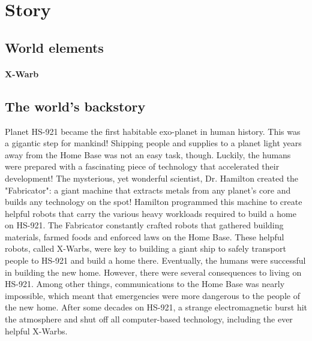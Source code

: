 \documentclass[../Main.tex]{subfiles}
\begin{document}
\section{Story}

\subsection{World elements}

\paragraph{X-Warb} 


\subsection{The world's backstory}

Planet HS-921 became the first habitable exo-planet in human history. This was a gigantic step for mankind! Shipping people and supplies to a planet light years away from the Home Base was not an easy task, though. Luckily, the humans were prepared with a fascinating piece of technology that accelerated their development! The mysterious, yet wonderful scientist, Dr. Hamilton created the "Fabricator": a giant machine that extracts metals from any planet's core and builds any technology on the spot! Hamilton programmed this machine to create helpful robots that carry the various heavy workloads required to build a home on HS-921. The Fabricator constantly crafted robots that gathered building materials, farmed foods and enforced laws on the Home Base. These helpful robots, called X-Warbs, were key to building a giant ship to safely transport people to HS-921 and build a home there. Eventually, the humans were successful in building the new home. However, there were several consequences to living on HS-921. Among other things, communications to the Home Base was nearly impossible, which meant that emergencies were more dangerous to the people of the new home. After some decades on HS-921, a strange electromagnetic burst hit the atmosphere and shut off all computer-based technology, including the ever helpful X-Warbs. 
\end{document}
